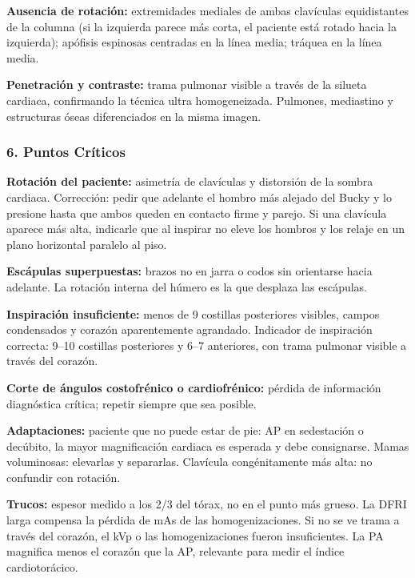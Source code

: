 \documentclass[9pt,a4paper,twocolumn,twoside]{tau-class/tau}
\begin{document}
	\textbf{Ausencia de rotación:} extremidades mediales de ambas clavículas equidistantes de la columna (si la izquierda parece más corta, el paciente está rotado hacia la izquierda); apófisis espinosas centradas en la línea media; tráquea en la línea media.
	
	\textbf{Penetración y contraste:} trama pulmonar visible a través de la silueta cardiaca, confirmando la técnica ultra homogeneizada. Pulmones, mediastino y estructuras óseas diferenciados en la misma imagen.
	
	\subsubsection*{6. Puntos Críticos}
	
	\textbf{Rotación del paciente:} asimetría de clavículas y distorsión de la sombra cardiaca. Corrección: pedir que adelante el hombro más alejado del Bucky y lo presione hasta que ambos queden en contacto firme y parejo. Si una clavícula aparece más alta, indicarle que al inspirar no eleve los hombros y los relaje en un plano horizontal paralelo al piso.
	
	\textbf{Escápulas superpuestas:} brazos no en jarra o codos sin orientarse hacia adelante. La rotación interna del húmero es la que desplaza las escápulas.
	
	\textbf{Inspiración insuficiente:} menos de 9 costillas posteriores visibles, campos condensados y corazón aparentemente agrandado. Indicador de inspiración correcta: 9--10 costillas posteriores y 6--7 anteriores, con trama pulmonar visible a través del corazón.
	
	\textbf{Corte de ángulos costofrénico o cardiofrénico:} pérdida de información diagnóstica crítica; repetir siempre que sea posible.
	
	\textbf{Adaptaciones:} paciente que no puede estar de pie: AP en sedestación o decúbito, la mayor magnificación cardiaca es esperada y debe consignarse. Mamas voluminosas: elevarlas y separarlas. Clavícula congénitamente más alta: no confundir con rotación.
	
	\textbf{Trucos:} espesor medido a los 2/3 del tórax, no en el punto más grueso. La DFRI larga compensa la pérdida de mAs de las homogenizaciones. Si no se ve trama a través del corazón, el kVp o las homogenizaciones fueron insuficientes. La PA magnifica menos el corazón que la AP, relevante para medir el índice cardiotorácico.
	
	
\end{document}
